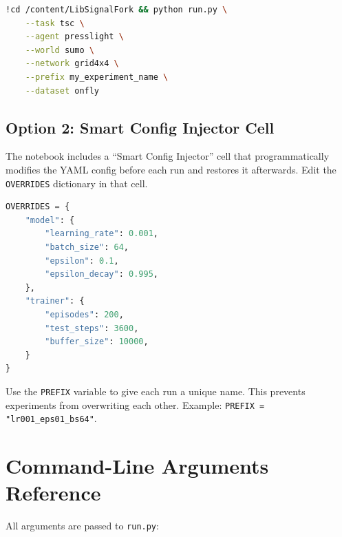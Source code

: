 \documentclass[11pt,a4paper]{article}
\begin{document}
\begin{lstlisting}[language=bash]
!cd /content/LibSignalFork && python run.py \
    --task tsc \
    --agent presslight \
    --world sumo \
    --network grid4x4 \
    --prefix my_experiment_name \
    --dataset onfly
\end{lstlisting}

\subsection{Option 2: Smart Config Injector Cell}

The notebook includes a ``Smart Config Injector'' cell that programmatically modifies the YAML config before each run and restores it afterwards.  Edit the \texttt{OVERRIDES} dictionary in that cell.

\begin{lstlisting}[language=Python]
OVERRIDES = {
    "model": {
        "learning_rate": 0.001,
        "batch_size": 64,
        "epsilon": 0.1,
        "epsilon_decay": 0.995,
    },
    "trainer": {
        "episodes": 200,
        "test_steps": 3600,
        "buffer_size": 10000,
    }
}
\end{lstlisting}

\begin{tipbox}
Use the \texttt{PREFIX} variable to give each run a unique name.
This prevents experiments from overwriting each other.
Example: \texttt{PREFIX = "lr001\_eps01\_bs64"}.
\end{tipbox}

\section{Command-Line Arguments Reference}

All arguments are passed to \texttt{run.py}:
\end{document}
